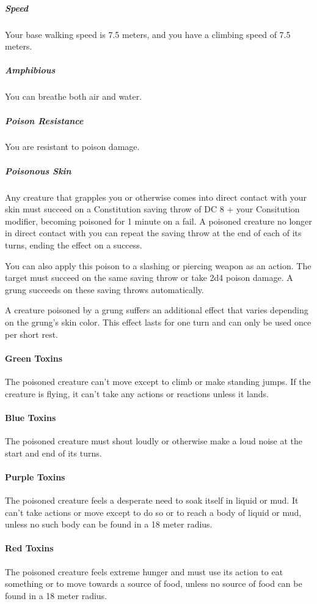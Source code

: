 \begin{linenumbers}
\subparagraph{Speed} Your base walking speed is 7.5 meters, and you have a climbing speed of 7.5 meters.


\subparagraph{Amphibious} You can breathe both air and water.

\subparagraph{Poison Resistance} You are resistant to poison damage.

\subparagraph{Poisonous Skin} Any creature that grapples you or otherwise comes into direct contact with your skin must succeed on a Constitution saving throw of DC 8 + your Consitution modifier, becoming poisoned for 1 minute on a fail.
A poisoned creature no longer in direct contact with you can repeat the saving throw at the end of each of its turns, ending the effect on a success.

You can also apply this poison to a slashing or piercing weapon as an action. %
The target must succeed on the same saving throw or take 2d4 poison damage.
A grung succeeds on these saving throws automatically.

A creature poisoned by a grung suffers an additional effect that varies depending on the grung's skin color.
This effect lasts for one turn and can only be used once per short rest.

\paragraph{Green Toxins} The poisoned creature can't move except to climb or make standing jumps.
If the creature is flying, it can't take any actions or reactions unless it lands.

\paragraph{Blue Toxins} The poisoned creature must shout loudly or otherwise make a loud noise at the start and end of its turns.

\paragraph{Purple Toxins} The poisoned creature feels a desperate need to soak itself in liquid or mud.
It can't take actions or move except to do so or to reach a body of liquid or mud, unless no such body can be found in a 18 meter radius.

\paragraph{Red Toxins} The poisoned creature feels extreme hunger and must use its action to eat something or to move towards a source of food, unless no source of food can be found in a 18 meter radius.


\end{linenumbers}
